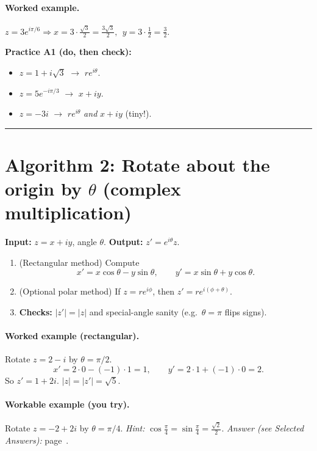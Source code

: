 \documentclass[11pt]{article}
\begin{document}
\paragraph{Worked example.} \(z=3e^{i\pi/6}\Rightarrow x=3\cdot \tfrac{\sqrt3}{2}=\tfrac{3\sqrt3}{2},\ \ y=3\cdot \tfrac12=\tfrac{3}{2}\).

\medskip
\noindent\textbf{Practice A1 (do, then check):}
\begin{itemize}
  \item \(z=1+i\sqrt{3}\) \(\to\) \(re^{i\theta}\).
  \item \(z=5e^{-i\pi/3}\) \(\to\) \(x+iy\).
  \item \(z=-3i\) \(\to\) \(re^{i\theta}\) \emph{and} \(x+iy\) (tiny!).
\end{itemize}

\bigskip
\hrule
\bigskip

\section*{Algorithm 2: Rotate about the origin by \(\theta\) (complex multiplication)}
\textbf{Input:} \(z=x+iy\), angle \(\theta\). \quad
\textbf{Output:} \(z'=e^{i\theta}z\).

\begin{enumerate}[label=\textbf{Step \arabic*.}]
  \item (Rectangular method) Compute
  \[
  x'=x\cos\theta - y\sin\theta,\qquad
  y'=x\sin\theta + y\cos\theta.
  \]
  \item (Optional polar method) If \(z=re^{i\phi}\), then \(z'=re^{i(\phi+\theta)}\).
  \item \textbf{Checks:} \(|z'|=|z|\) and special-angle sanity (e.g.\ \(\theta=\pi\) flips signs).
\end{enumerate}

\paragraph{Worked example (rectangular).}
Rotate \(z=2-i\) by \(\theta=\pi/2\).
\[
x'=2\cdot 0 - (-1)\cdot 1=1,\qquad
y'=2\cdot 1 + (-1)\cdot 0=2.
\]
So \(z'=1+2i\). \(|z|=|z'|=\sqrt{5}\).

\paragraph{Workable example (you try).}
Rotate \(z=-2+2i\) by \(\theta=\pi/4\).
\emph{Hint:} \(\cos\frac{\pi}{4}=\sin\frac{\pi}{4}=\frac{\sqrt{2}}{2}\).
\emph{Answer (see Selected Answers):} page~\pageref{answersA1}.
\end{document}
